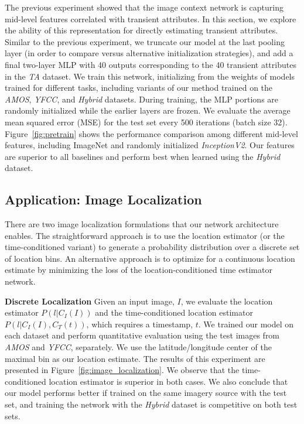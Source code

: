 \documentclass{bmvc2k}
\newcommand{\figref}[1]{Figure~\ref{fig:#1}}
\begin{document}
The previous experiment showed that the image context network is
capturing mid-level features correlated with transient attributes. In
this section, we explore the ability of this representation for
directly estimating transient attributes. Similar to the previous
experiment, we truncate our model at the last pooling layer (in order
to compare versus alternative initialization strategies), and add a
final two-layer MLP with 40 outputs corresponding to the 40 transient
attributes in the {\em TA} dataset. We train this
network, initializing from the weights of models trained for different
tasks, including variants of our method trained on the {\em AMOS}, {\em YFCC}, and
{\em Hybrid} datasets. During training, the MLP portions are randomly
initialized while the earlier layers are frozen. We evaluate the
average mean squared error (MSE) for the test set every 500 iterations
(batch size 32). \figref{pretrain} shows the performance comparison
among different mid-level features, including ImageNet and randomly
initialized {\em InceptionV2}. Our features are superior to
all baselines and perform best when learned using the {\em Hybrid} dataset. 


\subsection{Application: Image Localization}

There are two image localization formulations that our network
architecture enables. The straightforward approach is to use the
location estimator (or the time-conditioned variant) to generate a
probability distribution over a discrete set of location bins. An
alternative approach is to optimize for a continuous location estimate
by minimizing the loss of the location-conditioned time estimator
network.

\noindent \textbf{Discrete Localization} Given an input image, $I$, we
evaluate the location estimator $P(l|C_I(I))$ and the time-conditioned
location estimator $P(l|C_I(I),C_T(t))$, which requires a timestamp,
$t$. We trained our model on each dataset and perform quantitative
evaluation using the test images from {\em AMOS} and {\em YFCC},
separately. We use the latitude/longitude center of the maximal bin as
our location estimate.  The results of this experiment are presented
in \figref{image_localization}.  We observe that the time-conditioned
location estimator is superior in both cases. We also conclude that
our model performs better if trained on the same imagery source with
the test set, and training the network with the {\em Hybrid} dataset
is competitive on both test sets. 
\end{document}
